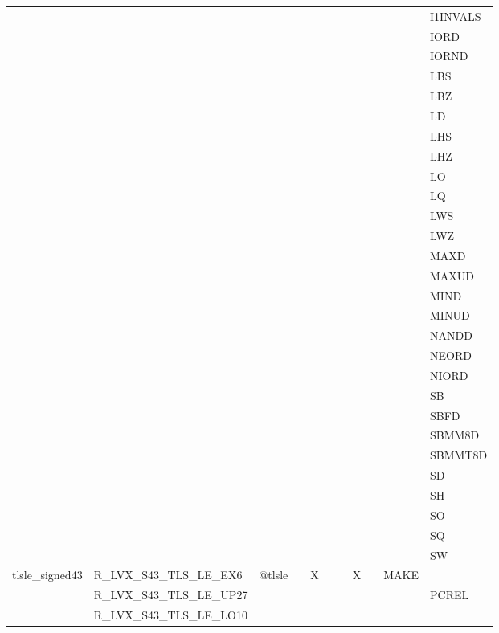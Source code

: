 {\begin{tabular}{|l|l|l|l|l|l|l|l|l|l|l|}
 & & & & & & & & & & \textsf{I1INVALS} \\
 & & & & & & & & & & \textsf{IORD} \\
 & & & & & & & & & & \textsf{IORND} \\
 & & & & & & & & & & \textsf{LBS} \\
 & & & & & & & & & & \textsf{LBZ} \\
 & & & & & & & & & & \textsf{LD} \\
 & & & & & & & & & & \textsf{LHS} \\
 & & & & & & & & & & \textsf{LHZ} \\
 & & & & & & & & & & \textsf{LO} \\
 & & & & & & & & & & \textsf{LQ} \\
 & & & & & & & & & & \textsf{LWS} \\
 & & & & & & & & & & \textsf{LWZ} \\
 & & & & & & & & & & \textsf{MAXD} \\
 & & & & & & & & & & \textsf{MAXUD} \\
 & & & & & & & & & & \textsf{MIND} \\
 & & & & & & & & & & \textsf{MINUD} \\
 & & & & & & & & & & \textsf{NANDD} \\
 & & & & & & & & & & \textsf{NEORD} \\
 & & & & & & & & & & \textsf{NIORD} \\
 & & & & & & & & & & \textsf{SB} \\
 & & & & & & & & & & \textsf{SBFD} \\
 & & & & & & & & & & \textsf{SBMM8D} \\
 & & & & & & & & & & \textsf{SBMMT8D} \\
 & & & & & & & & & & \textsf{SD} \\
 & & & & & & & & & & \textsf{SH} \\
 & & & & & & & & & & \textsf{SO} \\
 & & & & & & & & & & \textsf{SQ} \\
 & & & & & & & & & & \textsf{SW} \\
\hline
\textsf{tlsle\_signed43} & \textsf{R\_LVX\_S43\_TLS\_LE\_EX6} & \textsf{@tlsle} & \textsf{} & \textsf{X} & \textsf{} & \textsf{} & \textsf{X} & \textsf{} & \textsf{MAKE} \\
 & \textsf{R\_LVX\_S43\_TLS\_LE\_UP27} & & & & & & & & & \textsf{PCREL} \\
 & \textsf{R\_LVX\_S43\_TLS\_LE\_LO10} & & & & & & & & & \\

\end{tabular}}
